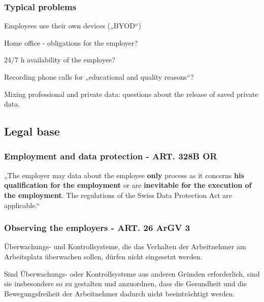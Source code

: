 \subsubsection{Typical problems}
\begin{compactitem}
	\item Employees use their own devices („BYOD“)
	\item Home office - obligations for the employer?
	\item 24/7 h availability of the employee?
	\item Recording phone calls for „educational and quality reasons“?
	\item Mixing professional and private data: questions about the release of saved private data.
\end{compactitem}

\subsection{Legal base}
\subsubsection{Employment and data protection - ART. 328B OR}
„The employer may data about the employee \textbf{only} process as it concerns\textbf{ his qualification for the employment} or are \textbf{inevitable for the execution of the employment}. The regulations of the Swiss Data Protection Act are applicable.“

\subsubsection{Observing the employers - ART. 26 ArGV 3}
\begin{compactenum}
	\item Überwachungs- und Kontrollsysteme, die das Verhalten der Arbeitnehmer	am Arbeitsplatz überwachen sollen, dürfen nicht eingesetzt werden.
	\item Sind Überwachungs- oder Kontrollsysteme aus anderen Gründen erforderlich, sind sie insbesondere so zu gestalten und anzuordnen, dass die Gesundheit und die Bewegungsfreiheit der Arbeitnehmer dadurch nicht beeinträchtigt werden.
\end{compactenum}

